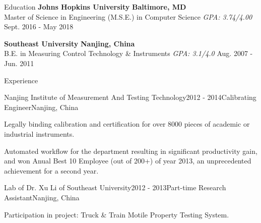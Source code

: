 \documentclass{resume} %
\begin{document}

\begin{rSection}{Education}
{\bf Johns Hopkins University} \hfill {\bf Baltimore, MD} \\
{Master of Science in Engineering (M.S.E.) in Computer Science} {\em GPA: 3.74/4.00} \hfill {Sept. 2016 - May 2018}

{\bf Southeast University} \hfill {\bf Nanjing, China} \\
{B.E. in Measuring Control Technology \& Instruments} {\em GPA: 3.1/4.0} \hfill {Aug. 2007 - Jun. 2011}
\end{rSection}



\begin{rSection}{Experience}

\begin{rSubsection}{Nanjing Institute of Measurement And Testing Technology}{2012 - 2014}{Calibrating Engineer}{Nanjing, China}
\item Legally binding calibration and certification for over 8000 pieces of academic or industrial instruments.
\item Automated workflow for the department resulting in significant productivity gain, and won Anual Best 10 Employee (out of 200+) of year 2013, an unprecedented achievement for a second year.
\end{rSubsection}

\begin{rSubsection}{Lab of Dr. Xu Li of Southeast University}{2012 - 2013}{Part-time Research Assistant}{Nanjing, China}
\item Participation in project: Truck \& Train Motile Property Testing System.
\end{rSubsection}
\end{rSection}

\end{document}
